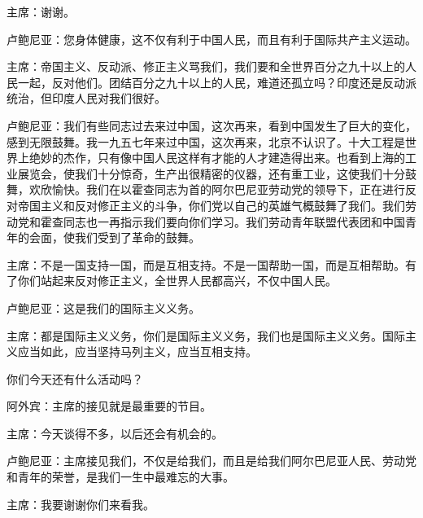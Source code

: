 主席：谢谢。

卢鲍尼亚：您身体健康，这不仅有利于中国人民，而且有利于国际共产主义运动。

主席：帝国主义、反动派、修正主义骂我们，我们要和全世界百分之九十以上的人民一起，反对他们。团结百分之九十以上的人民，难道还孤立吗？印度还是反动派统治，但印度人民对我们很好。

卢鲍尼亚：我们有些同志过去来过中国，这次再来，看到中国发生了巨大的变化，感到无限鼓舞。我一九五七年来过中国，这次再来，北京不认识了。十大工程是世界上绝妙的杰作，只有像中国人民这样有才能的人才建造得出来。也看到上海的工业展览会，使我们十分惊奇，生产出很精密的仪器，还有重工业，这使我们十分鼓舞，欢欣愉快。我们在以霍查同志为首的阿尔巴尼亚劳动党的领导下，正在进行反对帝国主义和反对修正主义的斗争，你们党以自己的英雄气概鼓舞了我们。我们劳动党和霍查同志也一再指示我们要向你们学习。我们劳动青年联盟代表团和中国青年的会面，使我们受到了革命的鼓舞。

主席：不是一国支持一国，而是互相支持。不是一国帮助一国，而是互相帮助。有了你们站起来反对修正主义，全世界人民都高兴，不仅中国人民。

卢鲍尼亚：这是我们的国际主义义务。

主席：都是国际主义义务，你们是国际主义义务，我们也是国际主义义务。国际主义应当如此，应当坚持马列主义，应当互相支持。

你们今天还有什么活动吗？

阿外宾：主席的接见就是最重要的节目。

主席：今天谈得不多，以后还会有机会的。

卢鲍尼亚：主席接见我们，不仅是给我们，而且是给我们阿尔巴尼亚人民、劳动党和青年的荣誉，是我们一生中最难忘的大事。

主席：我要谢谢你们来看我。

